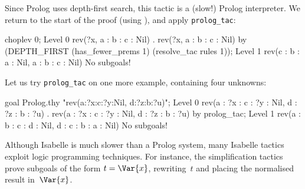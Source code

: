 Since {\sc Prolog} uses depth-first search, this tactic is a (slow!) {\sc
Prolog} interpreter.  We return to the start of the proof (using
), and apply {\tt prolog_tac}:
\begin{ttbox}
choplev 0;
{\out Level 0}
{\out rev(?x, a : b : c : Nil)}
{. rev(?x, a : b : c : Nil)}
\ttbreak
by (DEPTH_FIRST (has_fewer_prems 1) (resolve_tac rules 1));
{\out Level 1}
{\out rev(c : b : a : Nil, a : b : c : Nil)}
{\out No subgoals!}
\end{ttbox}
Let us try {\tt prolog_tac} on one more example, containing four unknowns:
\begin{ttbox}
goal Prolog.thy "rev(a:?x:c:?y:Nil, d:?z:b:?u)";
{\out Level 0}
{\out rev(a : ?x : c : ?y : Nil, d : ?z : b : ?u)}
{. rev(a : ?x : c : ?y : Nil, d : ?z : b : ?u)}
\ttbreak
by prolog_tac;
{\out Level 1}
{\out rev(a : b : c : d : Nil, d : c : b : a : Nil)}
{\out No subgoals!}
\end{ttbox}
Although Isabelle is much slower than a {\sc Prolog} system, many
Isabelle tactics exploit logic programming techniques.  For instance, the
simplification tactics prove subgoals of the form $t=\Var{x}$, rewriting~$t$
and placing the normalised result in~$\Var{x}$.

